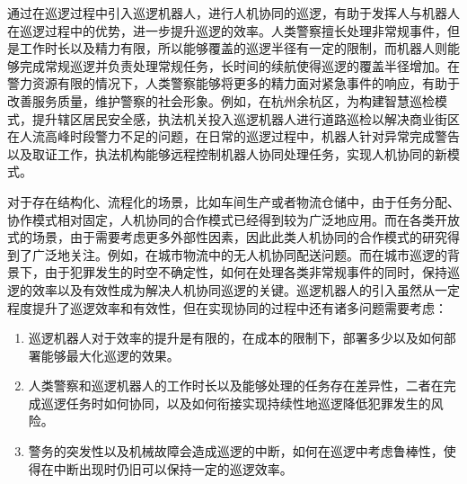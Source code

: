 \documentclass[finalformat,mathCMR]{HUSTthesis}
\begin{document}
通过在巡逻过程中引入巡逻机器人，进行人机协同的巡逻，有助于发挥人与机器人在巡逻过程中的优势，进一步提升巡逻的效率。人类警察擅长处理非常规事件，但是工作时长以及精力有限，所以能够覆盖的巡逻半径有一定的限制，而机器人则能够完成常规巡逻并负责处理常规任务，长时间的续航使得巡逻的覆盖半径增加。在警力资源有限的情况下，人类警察能够将更多的精力面对紧急事件的响应，有助于改善服务质量，维护警察的社会形象。例如，在杭州余杭区，为构建智慧巡检模式，提升辖区居民安全感，执法机关投入巡逻机器人进行道路巡检以解决商业街区在人流高峰时段警力不足的问题，在日常的巡逻过程中，机器人针对异常完成警告以及取证工作，执法机构能够远程控制机器人协同处理任务，实现人机协同的新模式\citep{YuHangFaBuShangGangYuHangShouGeChengShiXunLuoZhiNengJiQiRen2024}。


对于存在结构化、流程化的场景，比如车间生产\citep{huangSolvingHumanrobotCollaborative2024, yaoTaskReallocationHumanrobot2024}或者物流仓储\citep{zhenHowDeployRobotic2023a, qinPerformanceAnalysisMultitote2024, lofflerHumanrobotCooperationCoordinating2023a}中，由于任务分配、协作模式相对固定，人机协同的合作模式已经得到较为广泛地应用。而在各类开放式的场景，由于需要考虑更多外部性因素，因此此类人机协同的合作模式的研究得到了广泛地关注。例如，在城市物流中的无人机协同配送问题\citep{murray2015flying, zhou2023exact}。而在城市巡逻的背景下，由于犯罪发生的时空不确定性\citep{chenevoyDeterminingOptimalPolice2022}，如何在处理各类非常规事件的同时，保持巡逻的效率以及有效性成为解决人机协同巡逻的关键。巡逻机器人的引入虽然从一定程度提升了巡逻效率和有效性，但在实现协同的过程中还有诸多问题需要考虑：
\begin{enumerate}
	\item 巡逻机器人对于效率的提升是有限的，在成本的限制下，部署多少以及如何部署能够最大化巡逻的效果。
	\item 人类警察和巡逻机器人的工作时长以及能够处理的任务存在差异性，二者在完成巡逻任务时如何协同，以及如何衔接实现持续性地巡逻降低犯罪发生的风险。
	\item 警务的突发性以及机械故障会造成巡逻的中断，如何在巡逻中考虑鲁棒性，使得在中断出现时仍旧可以保持一定的巡逻效率。
\end{enumerate}


\end{document}
